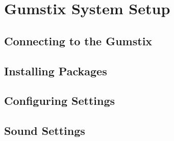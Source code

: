 %

\section{Gumstix System Setup}

\subsection{Connecting to the Gumstix}

\subsection{Installing Packages}

%

\subsection{Configuring Settings}

%

\subsection{Sound Settings}
